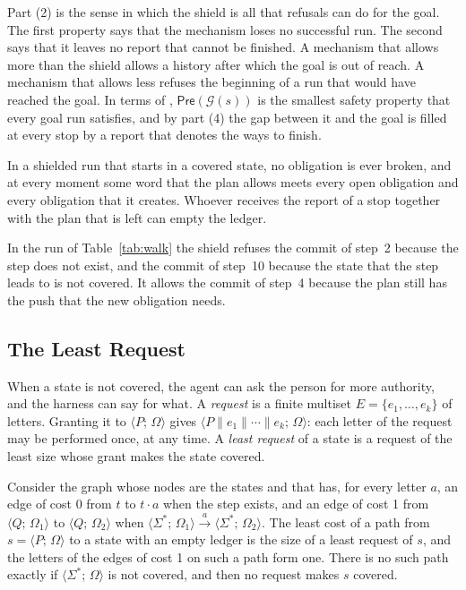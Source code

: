 \documentclass[acmsmall,nonacm,screen]{acmart}
\newcommand{\kw}[1]{\mathsf{#1}}
\newcommand{\st}[2]{\langle #1;\, #2 \rangle}
\newcommand{\pre}[1]{\kw{Pre}(#1)}
\newcommand{\goal}[1]{\mathcal{G}(#1)}
\newcommand{\sh}{\mathbin{\parallel}}
\newcommand{\step}[1]{\xrightarrow{\,#1\,}}
\begin{document}
Part (2) is the sense in which the shield is all that refusals can do for the goal. The
first property says that the mechanism loses no successful run. The second says that it
leaves no report that cannot be finished. A mechanism that allows more than the shield
allows a history after which the goal is out of reach. A mechanism that allows less refuses
the beginning of a run that would have reached the goal. In terms of
\citet{alpern1985}, $\pre{\goal{s}}$ is the smallest safety property that every goal run
satisfies, and by part (4) the gap between it and the goal is filled at every stop by a
report that denotes the ways to finish.

\begin{corollary}
\label{cor:owed}
In a shielded run that starts in a covered state, no obligation is ever broken, and at
every moment some word that the plan allows meets every open obligation and every obligation
that it creates. Whoever receives the report of a stop together with the plan that is left
can empty the ledger.
\end{corollary}

In the run of Table~\ref{tab:walk} the shield refuses the commit of step~2 because the step
does not exist, and the commit of step~10 because the state that the step leads to is not
covered. It allows the commit of step~4 because the plan still has the push that the new
obligation needs.

\subsection{The Least Request}

When a state is not covered, the agent can ask the person for more authority, and the
harness can say for what. A \emph{request} is a finite multiset $E = \{e_1, \ldots, e_k\}$ of
letters. Granting it to $\st{P}{\Omega}$ gives $\st{P \sh e_1 \sh \cdots \sh e_k}{\Omega}$:
each letter of the request may be performed once, at any time. A \emph{least request} of a
state is a request of the least size whose grant makes the state covered.

\begin{theorem}
\label{thm:ask}
Consider the graph whose nodes are the states and that has, for every letter $a$, an edge
of cost 0 from $t$ to $t \cdot a$ when the step exists, and an edge of cost 1 from
$\st{Q}{\Omega_1}$ to $\st{Q}{\Omega_2}$ when $\st{\Sigma^{*}}{\Omega_1} \step{a}
\st{\Sigma^{*}}{\Omega_2}$. The least cost of a path from $s = \st{P}{\Omega}$ to a state
with an empty ledger is the size of a least request of $s$, and the letters of the edges of
cost 1 on such a path form one. There is no such path exactly if
$\st{\Sigma^{*}}{\Omega}$ is not covered, and then no request makes $s$ covered.
\end{theorem}
\end{document}
